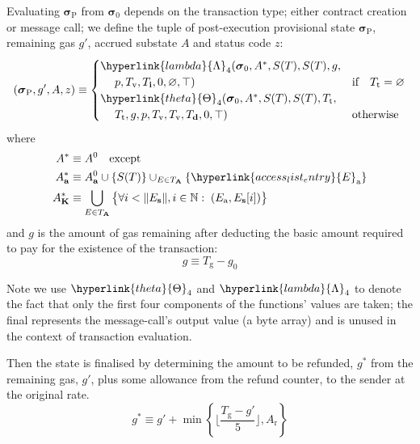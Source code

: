 \documentclass[9pt,oneside]{amsart}
\begin{document}
\begin{multicols}{2}
Evaluating $\boldsymbol{\sigma}_{\mathrm{P}}$ from $\boldsymbol{\sigma}_0$ depends on the transaction type; either contract creation or message call; we define the tuple of post-execution provisional state $\boldsymbol{\sigma}_{\mathrm{P}}$, remaining gas $g'$, accrued substate $A$ and status code $z$:
\begin{equation}
(\boldsymbol{\sigma}_{\mathrm{P}}, g', A, z) \equiv \begin{cases}
\hyperlink{lambda}{\Lambda}_{4}(\boldsymbol{\sigma}_0, A^*, S(T), S(T), g, &\\ \quad\; p, T_{\mathrm{v}}, T_{\mathbf{i}}, 0, \varnothing, \top) & \text{if} \quad T_{\mathrm{t}} = \varnothing \\
\hyperlink{theta}{\Theta}_{4}(\boldsymbol{\sigma}_0, A^*, S(T), S(T), T_{\mathrm{t}}, &\\ \quad\; T_{\mathrm{t}}, g, p, T_{\mathrm{v}}, T_{\mathrm{v}}, T_{\mathbf{d}}, 0, \top) & \text{otherwise}
\end{cases}
\end{equation}
where
\begin{align}
A^* & \equiv A^0 \quad \text{except} \\
A^*_{\mathbf{a}} & \equiv A^0_{\mathbf{a}} \cup \{S(T)\} \cup_{E \in T_{\mathbf{A}}} \{ \hyperlink{access_list_entry}{E}_{\mathrm{a}} \} \\
A^*_{\mathbf{K}} & \equiv \bigcup_{E \in T_{\mathbf{A}}} \big\{ \forall i < \lVert E_{\mathbf{s}} \rVert, i \in \mathbb{N}: \; (E_{\mathrm{a}}, E_{\mathbf{s}}[i]) \big\}
\end{align}
and $g$ is the amount of gas remaining after deducting the basic amount required to pay for the existence of the transaction:
\begin{equation}
g \equiv T_{\mathrm{g}} - g_0
\end{equation}

Note we use $\hyperlink{theta}{\Theta}_{4}$ and $\hyperlink{lambda}{\Lambda}_{4}$ to denote the fact that only the first four components of the functions' values are taken; the final represents the message-call's output value (a byte array) and is unused in the context of transaction evaluation.

Then the state is finalised by determining the amount to be refunded, $g^*$ from the remaining gas, $g'$, plus some allowance from the refund counter, to the sender at the original rate.
\begin{equation}
g^* \equiv g' + \min \left\{ \Big\lfloor \dfrac{T_{\mathrm{g}} - g'}{5} \Big\rfloor, A_{\mathrm{r}} \right\}
\end{equation}


\end{multicols}
\end{document}
